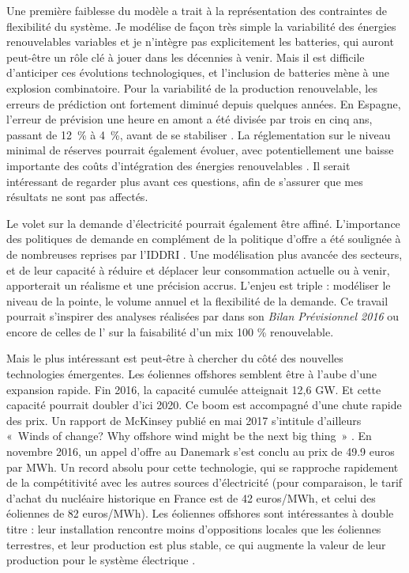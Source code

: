 Une première faiblesse du modèle a trait à la représentation des contraintes de flexibilité du système. Je modélise de façon très simple la variabilité des énergies renouvelables variables et je n'intègre pas explicitement les batteries, qui auront peut-être un rôle clé à jouer dans les décennies à venir. Mais il est difficile d'anticiper ces évolutions technologiques, et l'inclusion de batteries mène à une explosion combinatoire. 
Pour la variabilité de la production renouvelable, les erreurs de prédiction ont fortement diminué depuis quelques années. En Espagne, l’erreur de prévision une heure en amont a été divisée par trois en cinq ans, passant de 12~\% à 4~\%, avant de se stabiliser \citep{IRENA2017}. La réglementation sur le niveau minimal de réserves pourrait également évoluer, avec potentiellement une baisse importante des coûts d'intégration des énergies renouvelables \citep{Lorenz2017}. Il serait intéressant de regarder plus avant ces questions, afin de s’assurer que mes résultats ne sont pas affectés. 

Le volet sur la demande d’électricité pourrait également être affiné. L’importance des politiques de demande en complément de la politique d’offre a été soulignée à de nombreuses reprises par l’IDDRI \citep{Berghmans2017}. Une modélisation plus avancée des secteurs, et de leur capacité à réduire et déplacer leur consommation actuelle ou à venir, apporterait un réalisme et une précision accrus. L'enjeu est triple : modéliser le niveau de la pointe, le volume annuel et la flexibilité de la demande. Ce travail pourrait s'inspirer des analyses réalisées par \citet{RTE2016} dans son \textit{Bilan Prévisionnel 2016} ou encore de celles de l'\citet{ADEME2015} sur la faisabilité d'un mix 100 \% renouvelable.

Mais le plus intéressant est peut-être à chercher du côté des nouvelles technologies émergentes. 
Les éoliennes offshores semblent être à l’aube d’une expansion rapide. Fin 2016, la capacité cumulée atteignait 12,6 GW. Et cette capacité pourrait doubler d’ici 2020. Ce boom est accompagné d’une chute rapide des prix. Un rapport de McKinsey publié en mai 2017 s’intitule d’ailleurs «~Winds of change? Why offshore wind might be the next big thing~» \citep{McKinsey2017Wind}. En novembre 2016, un appel d’offre au Danemark s’est conclu au prix de 49.9 euros par MWh. Un record absolu pour cette technologie, qui se rapproche rapidement de la compétitivité avec les autres sources d’électricité (pour comparaison, le tarif d'achat du nucléaire historique en France est de 42 euros/MWh, et celui des éoliennes de 82 euros/MWh). Les éoliennes offshores sont intéressantes à double titre : leur installation rencontre moins d’oppositions locales que les éoliennes terrestres, et leur production est plus stable, ce qui augmente la valeur de leur production pour le système électrique \citep{Hirth2016}.

